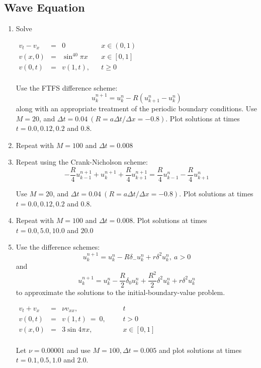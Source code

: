 \documentclass[12pt]{article}
\theoremstyle{definition}
\begin{document}
\subsection*{Wave Equation}

\begin{enumerate}
\item Solve
\begin{center}
$\begin{array}{lclll}
v_t-v_x&=& 0 && x\in(0,1)\\
v(x,0)&=&\sin^{40}\pi x && x\in[0,1]\\
v(0,t)&=& v(1,t), && t\geq 0\\
\end{array}$
\end{center}
Use the FTFS difference scheme:
\[u_k^{n+1}=u_k^n-R(u_{k+1}^n -u_k^n)\] along with an appropriate treatment of the periodic boundary conditions. Use $M=20$, and $\Delta t=0.04 \ (R=a\Delta t/\Delta x =-0.8)$. Plot solutions at times $t=0.0, 0.12, 0.2 $ and $0.8$.

\item Repeat with $M=100$ and $\Delta t=0.008$

\item Repeat using the Crank-Nicholson scheme:
\[-\frac{R}{4}u_{k-1}^{n+1}+u_k^{n+1}+\frac{R}{4}u_{k+1}^{n+1}=\frac{R}{4}u_{k-1}^n-\frac{R}{4}u_{k+1}^n\]

Use $M=20$, and $\Delta t=0.04 \ (R=a\Delta t/\Delta x =-0.8)$. Plot solutions at times $t=0.0, 0.12, 0.2 $ and $0.8$.
\graphicspath{ {4/} }

\item Repeat with $M=100$ and $\Delta t=0.008$. Plot solutions at times $t=0.0,5.0,10.0$ and $20.0$

\item Use the difference schemes:
\[u_k^{n+1}=u_k^n -R\delta_-u_k^n+r\delta^2u_k^n, \ a>0\]
and 
\[u_k^{n+1}=u_k^n -\frac{R}{2}\delta_0u_k^n+\frac{R^2}{2}\delta^2u_k^n+r\delta^2u_k^n\]
to approximate the solutions to the initial-boundary-value problem.
\begin{center}
$\begin{array}{rllllll}
v_t+v_x&=&\nu v_{xx}, &&& t\\
v(0,t)&=&v(1,t)\ = \ 0, &&& t>0\\
v(x,0)&=&3\sin 4\pi x, &&& x\in[0,1]\\
\end{array}$
\end{center}
Let $\nu=0.00001$ and use $M=100, \Delta t=0.005$ and plot solutions at times $t=0.1,0.5,1.0$ and $2.0$.

\end{enumerate}
\end{document}
